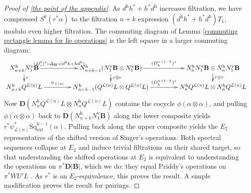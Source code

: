 \documentclass[11pt]{amsart} \renewcommand{\baselinestretch}{1.4}
\theoremstyle{plain}
\theoremstyle{definition}
\let\oldphi\phi
\let\phi\varphi
\newcommand{\calL}{\mathcal{L}}
\newcommand{\DeltatubfD}{\Delta_{\mathrm{\textbf{B}}}}
\newcommand{\ExtCohOp}{\mathrm{Sq}_\mathrm{ext}}
\newcommand{\UEA}{U'}%
\newcommand{\uver}{^\mathrm{v}}
\newcommand{\uhor}{^\mathrm{h}}
\newcommand{\dver}{_\mathrm{v}}
\newcommand{\dhor}{_\mathrm{h}}
\newcommand{\deltav}{\delta\uver}
\newcommand{\diag}[1]{|#1|}
\newcommand{\dual}{\mathbf{D}}
\begin{document}
\begin{appendices}
\begin{proof}[Proof of \ref{the point of the appendix}]
As $d\uhor h^*+ h^*d\uhor$ increases filtration, we have compressed $S^k(r^*\alpha)$ to the filtration $n+k$ expression $(d\uhor h^*+ h^*d\uhor)T_1$, modulo even higher filtration.
The commuting diagram of Lemma \ref{commuting rectangle lemma for lie operations} is the left square in a larger commuting diagram:
\[\xymatrix@R=4mm@C=15mm{
N\uhor_{n+k}N\uver_1\textbf{B} \ar[d]^-{r}
 \ar[r]^-{(D\dver^0)^\star\circ\DeltatubfD\circ (d\uhor h+hd\uhor)}&%
N\uhor_{n+k-1}(N\uver_1\textbf{B}\otimes N\uver_1\textbf{B})\ar[d]^-{r\otimes r}\ar[r]^-{ (D\dhor^{n+1-k})^\star}
&
N\uhor_nN\uver_1\textbf{B}\otimes N\uhor_nN\uver_1\textbf{B}\ar[d]^-{r\otimes r}
\\%
N\uhor_{n+k}Q^{\calL(n)} L  \ar[r]^-{\psi_{\calL(n)}}&%
N\uhor_{n+k-1}(Q^{\calL(n)} L \otimes Q^{\calL(n)} L )
\ar[r]^-{ (D\dhor^{n+1-k})^\star}
&
N\uhor_nQ^{\calL(n)} L \otimes N\uhor_nQ^{\calL(n)} L 
}\]
Now $\dual(N\uhor_nQ^{\calL(n)} L \otimes N\uhor_nQ^{\calL(n)} L )$ contains the cocycle $\oldphi(\alpha\otimes\alpha)$, and pulling $\oldphi(\alpha\otimes\alpha)$ back to $\dual(N\uhor_{n+k}N\uver_1\textbf{B})$ along the lower composite yields $r^*\psi_{\calL(n)}^*\ExtCohOp^{k-1}(\alpha)$. Pulling back along the upper composite yields the $E_2$ representative of the shifted version of Singer's operations. 
Both spectral sequences collapse at $E_2$ and induce trivial filtrations on their shared target, so that understanding the shifted operations at $E_2$ is equivalent to understanding the operations on $\pi^*\dual\diag{\textbf{B}}$, which we do: they equal Priddy's operations on $\pi^*\bar{W}\UEA L$ \cite[\S5]{PriddySimplicialLie.pdf}.
As $r^*$ is an $E_2$-equivalence, this proves the result. A simple modification proves the result for pairings.
\end{proof}

\end{appendices}
\end{document}
